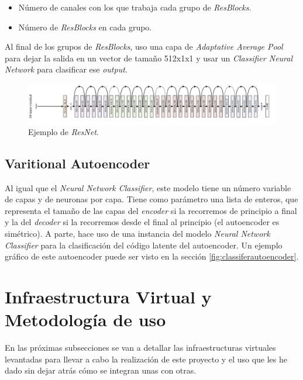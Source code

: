 \begin{itemize}
	\item Número de canales con los que trabaja cada grupo de \textit{ResBlocks}.
	\item Número de \textit{ResBlocks} en cada grupo.
\end{itemize}

Al final de los grupos de \textit{ResBlocks}, uso una capa de \textit{Adaptative Average Pool} para dejar la salida en un vector de tamaño 512x1x1 y usar un \textit{Classifier Neural Network} para clasificar ese \textit{output}.

\begin{figure}[H]
	\includegraphics[width=1.\linewidth]{imagenes/05_Implementacion/resnet.png}
	\centering
	\caption{Ejemplo de \textit{ResNet}. \cite{DBLP:journals/corr/HeZRS15}}
	\label{fig:resnet}
\end{figure}

\subsection{Varitional Autoencoder}\label{subsec:vae}

Al igual que el \textit{Neural Network Classifier}, este modelo tiene un número variable de capas y de neuronas por capa. Tiene como parámetro una lista de enteros, que representa el tamaño de las capas del \textit{encoder} si la recorremos de principio a final y la del \textit{decoder} si la recorremos desde el final al principio (el autoencoder es simétrico). A parte, hace uso de una instancia del modelo \textit{Neural Network Classifier} para la clasificación del código latente del autoencoder. Un ejemplo gráfico de este autoencoder puede ser visto en la sección \ref{fig:classiferautoencoder}.\\

\section{Infraestructura Virtual y Metodología de uso}

En las próximas subsecciones se van a detallar las infraestructuras virtuales levantadas para llevar a cabo la realización de este proyecto y el uso que les he dado sin dejar atrás cómo se integran unas con otras.\\


